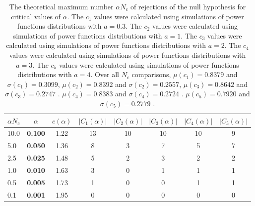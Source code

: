 \begin{table}[h!]
\begin{center}
\begin{tabular}{| l | c | c | c | c | c | c | c |}\hline
$\alpha N_c$ & $\alpha$ & $c(\alpha)$ & $|C_1(\alpha)|$ & $|C_2(\alpha)|$ & $|C_3(\alpha)|$ & $|C_4(\alpha)|$ & $|C_5(\alpha)|$ \\\hline\hline
10.0 & {\bf 0.100} & 1.22 & 13 & 10 & 10 & 10 & 9 \\\hline
5.0 & {\bf 0.050} & 1.36 & 8 & 3 & 7 & 5 & 7 \\\hline
2.5 & {\bf 0.025} & 1.48 & 5 & 2 & 3 & 2 & 2 \\\hline
1.0 & {\bf 0.010} & 1.63 & 3 & 0 & 1 & 1 & 1 \\\hline
0.5 & {\bf 0.005} & 1.73 & 1 & 0 & 0 & 1 & 1 \\\hline
0.1 & {\bf 0.001} & 1.95 & 0 & 0 & 0 & 0 & 0 \\\hline
\end{tabular}
\caption{The theoretical maximum number $\alpha N_c$ of rejections
        of the null hypothesis for critical values of $\alpha$.
        The $c_1$ values were calculated using simulations of power functions distributions with $a=0.3$.
        The $c_2$ values were calculated using simulations of power functions distributions with $a=1$.
        The $c_3$ values were calculated using simulations of power functions distributions with $a=2$.
        The $c_4$ values were calculated using simulations of power functions distributions with $a=3$.
        The $c_5$ values were calculated using simulations of power functions distributions with $a=4$.
        Over all $N_c$ comparisons,
         $\mu(c_1)=0.8379$ and $\sigma(c_1)=0.3099$,
         $\mu(c_2)=0.8392$ and $\sigma(c_2)=0.2557$,
         $\mu(c_3)=0.8642$ and $\sigma(c_3)=0.2747$ .
         $\mu(c_4)=0.8383$ and $\sigma(c_4)=0.2724$ .
         $\mu(c_5)=0.7920$ and $\sigma(c_5)=0.2779$ .
        }
\end{center}
\end{table}